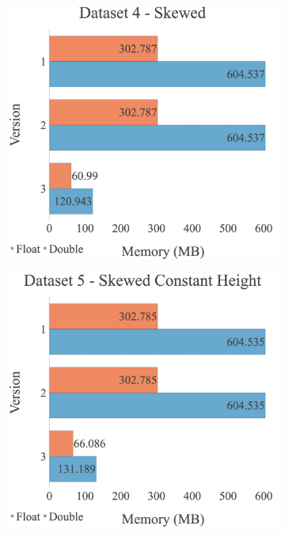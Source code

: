 \begin{figure}[H]
\begin{adjustwidth}{-2cm}{-2cm}
\begin{subfigure}{.62\textwidth}
  \centering
  \includegraphics[width=1\textwidth]{img/experiments/mem-multi-versions-4_SKEWED.png}
\end{subfigure}
\begin{subfigure}{.62\textwidth}
  \centering
  \includegraphics[width=1\textwidth]{img/experiments/mem-multi-versions-5_SKEWEDCONSTHEIGHT.png}

\end{subfigure}
\end{adjustwidth}
\end{figure}
